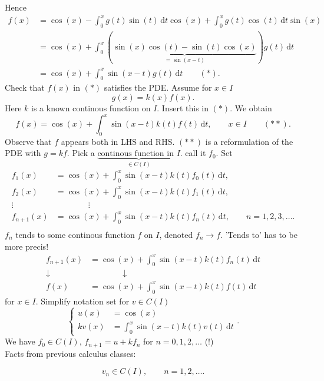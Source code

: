 \begin{enumerate}[1.]
	Hence
	\begin{align*}
		f(x) &= \cos(x) - \int_{0}^{x} g(t) \sin(t) \,\mathrm{d}t \cos(x) + \int_{0}^{x} g(t) \cos(t) \,\mathrm{d}t \sin(x) \\
		&= \cos(x) + \int_{0}^{x} (\underset{=\sin(x-t)}{\underbrace{\sin(x)\cos(t)- \sin(t)\cos(x)}})g(t) \,\mathrm{d}t \\
		&= \cos(x) + \int_{0}^{x}\sin(x-t)g(t) \,\mathrm{d}t \qquad (*).
	\end{align*}
	Check that $f(x)$ in $(*)$ satisfies the PDE.
	Assume for $x \in I$
	\[
		g(x) = k(x)f(x).
	\]
	Here $k$ is a known continous function on $I$. Insert this in $(*)$. We obtain
	\[
		f(x) = \cos(x) + \int_{0}^{x} \sin(x-t)k(t)f(t) \,\mathrm{d}t, \qquad x \in I \qquad (**).
	\]
	Observe that $f$ appears both in LHS and RHS. $(**)$ is a reformulation of the PDE with $g=kf$. Pick a $\underset{\in C(I)}{\underbrace{\text{continous function in $I$}}}$. call it $f_0$. Set
	\begin{align*}
		f_1(x) &= \cos(x) + \int_{0}^{x}\sin(x-t)k(t)f_0(t) \,\mathrm{d}t, \\
		f_2(x) &= \cos(x) + \int_{0}^{x}\sin(x-t)k(t)f_1(t) \,\mathrm{d}t, \\
		\vdots &\qquad \qquad  \vdots \\
		f_{n+1}(x) &= \cos(x) + \int_{0}^{x}\sin(x-t)k(t)f_n(t) \,\mathrm{d}t, \qquad n=1,2,3, \dots. \\
	\end{align*}
	 $f_n$ tends to some continous function $f$ on $I$, denoted $f_n \to f$. 'Tends to' has to be more precis! 
	\begin{align*}
		f_{n+1}(x) &= \cos(x) + \int_{0}^{x} \sin(x-t)k(t)f_n(t) \,\mathrm{d}t \\
		\downarrow & \qquad \qquad \downarrow \\
		f(x) &= \cos(x) + \int_{0}^{x} \sin(x-t)k(t)f(t) \,\mathrm{d}t
	\end{align*}
	for $x \in I$. Simplify notation set for $v \in C(I)$
	\[
		\begin{cases}
			u(x)&=\cos(x)\\
			kv(x)&= \int_{0}^{x} \sin(x-t)k(t)v(t) \,\mathrm{d}t
		\end{cases}.
	\]
	We have $f_0 \in C(I)$, $f_{n+1}=u + k f_n$ for $n=0,1,2, \dots$ (!) \\
	Facts from previous calculus classes:
	\begin{definition*}
		\[
			v_n \in C(I), \qquad n=1,2,\dots.
\]
\end{definition*}
\end{enumerate}
